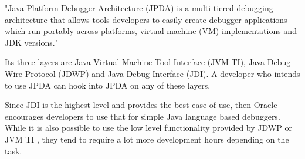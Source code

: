\documentclass[..thesis.tex]{subfiles}
\begin{document}
"Java Platform Debugger Architecture (JPDA) is a multi-tiered debugging architecture that allows tools developers to easily create debugger applications which run portably across platforms, virtual machine (VM) implementations and JDK versions."\cite{oracle_jpda_spec} 

Its three layers are Java Virtual Machine Tool Interface (JVM TI), Java Debug Wire Protocol (JDWP) and Java Debug Interface (JDI). 
A developer who intends to use JPDA can hook into JPDA on any of these layers. \cite{oracle_jpda_spec} 



Since JDI is the highest level and provides the best ease of use, then Oracle encourages developers to use that for simple Java language based debuggers.\cite{oracle_jpda_spec}
While it is also possible to use the low level functionality provided by JDWP or JVM TI , they tend to require a lot more development hours depending on the task. 
\end{document}

